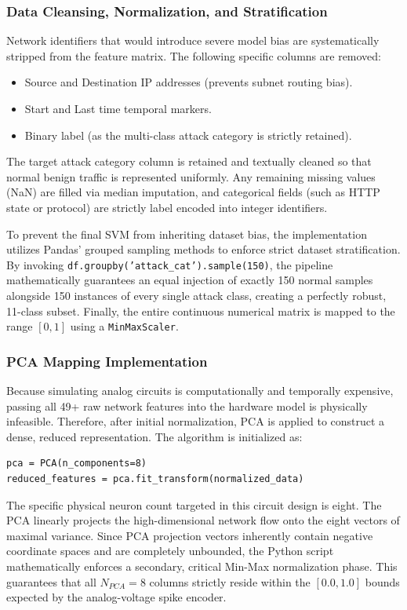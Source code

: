\documentclass{ieeeaccess}
\begin{document}
\subsubsection{Data Cleansing, Normalization, and Stratification}
Network identifiers that would introduce severe model bias are systematically stripped from the feature matrix. The following specific columns are removed:
\begin{itemize}
\item Source and Destination IP addresses (prevents subnet routing bias).
\item Start and Last time temporal markers.
\item Binary label (as the multi-class attack category is strictly retained).
\end{itemize}

The target attack category column is retained and textually cleaned so that normal benign traffic is represented uniformly. Any remaining missing values (NaN) are filled via median imputation, and categorical fields (such as HTTP state or protocol) are strictly label encoded into integer identifiers. 

To prevent the final SVM from inheriting dataset bias, the implementation utilizes Pandas' grouped sampling methods to enforce strict dataset stratification. By invoking \texttt{df.groupby('attack\_cat').sample(150)}, the pipeline mathematically guarantees an equal injection of exactly 150 normal samples alongside 150 instances of every single attack class, creating a perfectly robust, 11-class subset. Finally, the entire continuous numerical matrix is mapped to the range $[0, 1]$ using a \texttt{MinMaxScaler}.

\subsubsection{PCA Mapping Implementation}

Because simulating analog circuits is computationally and temporally expensive, passing all 49+ raw network features into the hardware model is physically infeasible. Therefore, after initial normalization, PCA is applied to construct a dense, reduced representation. The algorithm is initialized as:
{\scriptsize
\begin{verbatim}
pca = PCA(n_components=8)
reduced_features = pca.fit_transform(normalized_data)
\end{verbatim}
}

The specific physical neuron count targeted in this circuit design is eight. The PCA linearly projects the high-dimensional network flow onto the eight vectors of maximal variance. Since PCA projection vectors inherently contain negative coordinate spaces and are completely unbounded, the Python script mathematically enforces a secondary, critical Min-Max normalization phase. This guarantees that all $N_{PCA}=8$ columns strictly reside within the $[0.0, 1.0]$ bounds expected by the analog-voltage spike encoder. 
\end{document}
